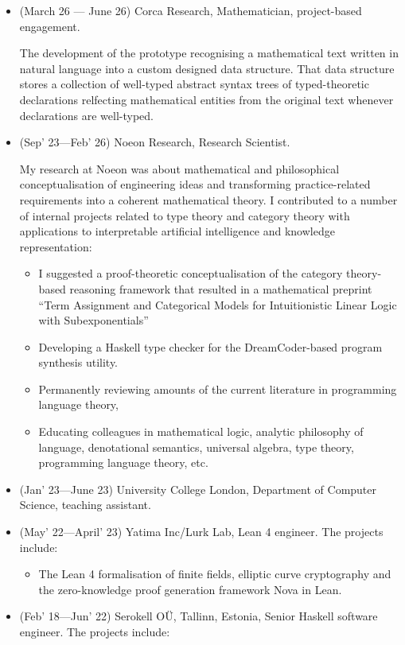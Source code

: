 \documentclass[11pt,a4paper]{article}
\begin{document}
\begin{itemize}[leftmargin=*]
    \item (March 26 --- June 26) Corca Research, Mathematician, project-based engagement. 
    
     The development of the prototype recognising a mathematical text written in natural language
     into a custom designed data structure. That data structure stores a collection of well-typed abstract syntax trees of typed-theoretic declarations relfecting mathematical entities from the original text whenever
     declarations are well-typed.
    \item (Sep' 23---Feb' 26) Noeon Research, Research Scientist. 
    
    My research at Noeon was about mathematical and philosophical conceptualisation of engineering ideas and transforming practice-related requirements
    into a coherent mathematical theory. I contributed to a number of internal projects related to type theory and category theory with applications to interpretable
    artificial intelligence and knowledge representation:
\begin{itemize}
    \item I suggested a proof-theoretic conceptualisation of the category theory-based reasoning framework that resulted in a mathematical preprint ``Term Assignment and Categorical Models for Intuitionistic Linear Logic with Subexponentials''
    \item Developing a Haskell type checker for the DreamCoder-based program synthesis utility.
    \item Permanently reviewing amounts of the current literature in programming language theory,
    \item Educating colleagues in mathematical logic, analytic philosophy of language, denotational semantics, universal algebra, type theory, programming language theory, etc.
\end{itemize}
    \item (Jan' 23---June 23) University College London, Department of Computer Science, teaching assistant.
    \item (May' 22---April' 23) Yatima Inc/Lurk Lab, Lean 4 engineer. The projects include:
    \begin{itemize}
    \item The Lean 4 formalisation of finite fields, elliptic curve cryptography and the zero-knowledge proof generation framework Nova in Lean.
    \end{itemize} 
    \item (Feb' 18---Jun' 22) Serokell OÜ, Tallinn, Estonia, Senior Haskell software engineer. The projects include:

\end{itemize}
\end{document}
